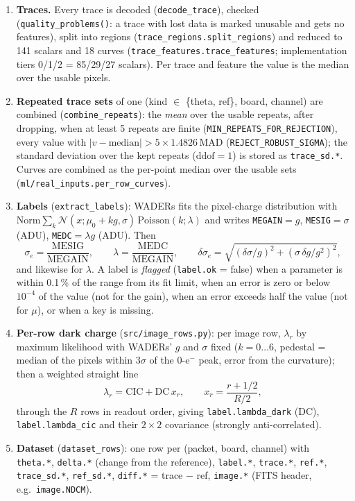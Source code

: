 \documentclass[10pt]{article}
\newcommand{\code}[1]{\texttt{#1}}
\newcommand{\se}{\sigma_e}
\begin{document}
\begin{enumerate}
  \item \textbf{Traces.} Every trace is decoded (\code{decode\_trace}), checked (\code{quality\_problems()}: a trace with
        lost data is marked unusable and gets no features), split into regions (\code{trace\_regions.split\_regions}) and
        reduced to 141 scalars and 18 curves (\code{trace\_features.trace\_features}; implementation tiers 0/1/2 =
        85/29/27 scalars). Per trace and feature the value is the median over the usable pixels.
  \item \textbf{Repeated trace sets} of one (kind $\in$ \{theta, ref\}, board, channel) are combined
        (\code{combine\_repeats}): the \emph{mean} over the usable repeats, after dropping, when at least 5 repeats are
        finite (\code{MIN\_REPEATS\_FOR\_REJECTION}), every value with $|v - \mathrm{median}| > 5 \times 1.4826\,
        \mathrm{MAD}$ (\code{REJECT\_ROBUST\_SIGMA}); the standard deviation over the kept repeats ($\mathrm{ddof}=1$) is
        stored as \code{trace\_sd.*}. Curves are combined as the per-point median over the usable sets
        (\code{ml/real\_inputs.per\_row\_curves}).
  \item \textbf{Labels} (\code{extract\_labels}): WADERs fits the pixel-charge distribution with
        $\mathrm{Norm}\sum_k \mathcal N(x; \mu_0 + k g, \sigma)\,\mathrm{Poisson}(k;\lambda)$ and writes
        \code{MEGAIN}$=g$, \code{MESIG}$=\sigma$ (ADU), \code{MEDC}$=\lambda g$ (ADU). Then
        \[ \se = \frac{\mathrm{MESIG}}{\mathrm{MEGAIN}},\qquad \lambda = \frac{\mathrm{MEDC}}{\mathrm{MEGAIN}},\qquad
           \delta\se = \sqrt{(\delta\sigma/g)^2 + (\sigma\,\delta g/g^2)^2}, \]
        and likewise for $\lambda$. A label is \emph{flagged} (\code{label.ok} = false) when a parameter is within 0.1\,\%
        of the range from its fit limit, when an error is zero or below $10^{-4}$ of the value (not for the gain), when an
        error exceeds half the value (not for $\mu$), or when a key is missing.
  \item \textbf{Per-row dark charge} (\code{src/image\_rows.py}): per image row, $\lambda_r$ by maximum likelihood with
        WADERs' $g$ and $\sigma$ fixed ($k = 0\dots6$, pedestal = median of the pixels within $3\sigma$ of the 0-e$^-$
        peak, error from the curvature); then a weighted straight line
        \[ \lambda_r = \mathrm{CIC} + \mathrm{DC}\,x_r,\qquad x_r = \frac{r + 1/2}{R/2}, \]
        through the $R$ rows in readout order, giving \code{label.lambda\_dark} (DC), \code{label.lambda\_cic} and their
        $2\times2$ covariance (strongly anti-correlated).
  \item \textbf{Dataset} (\code{dataset\_rows}): one row per (packet, board, channel) with \code{theta.*},
        \code{delta.*} (change from the reference), \code{label.*}, \code{trace.*}, \code{ref.*}, \code{trace\_sd.*},
        \code{ref\_sd.*}, \code{diff.*} = trace $-$ ref, \code{image.*} (FITS header, e.g.\ \code{image.NDCM}).
\end{enumerate}
\end{document}
